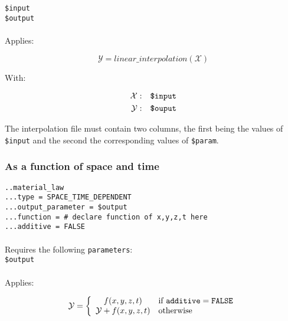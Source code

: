 \documentclass[10pt]{article}
\begin{document}
\noindent \verb+$input+\\
\verb+$output+

\paragraph{}Applies:

\begin{equation}
	\mathcal{Y} = linear\_interpolation(\mathcal{X})
\end{equation}

With:

\begin{eqnarray}
	\mathcal{X} & : & \verb+$input+ \notag \\
	\mathcal{Y} & : & \verb+$ouput+\notag  
\end{eqnarray}

The interpolation file must contain two columns, the first being the values of \verb+$input+ and the second the corresponding values of \verb+$param+.

\subsubsection{As a function of space and time}

\noindent \verb+..material_law+\\
\verb+...type = SPACE_TIME_DEPENDENT+\\
\verb+...output_parameter = $output+\\
\verb+...function = # declare function of x,y,z,t here+\\
\verb+...additive = FALSE+

\paragraph{}Requires the following \verb+parameters+:\\

\noindent \verb+$output+

\paragraph{}Applies:

\begin{equation}
	\mathcal{Y} = \left\{ \begin{array}{cl} f(x,y,z,t) & \text{if }\verb+additive+ = \verb+FALSE+  \\ \mathcal{Y} +f(x,y,z,t) & \text{otherwise} \end{array} \right.
\end{equation}
\end{document}
